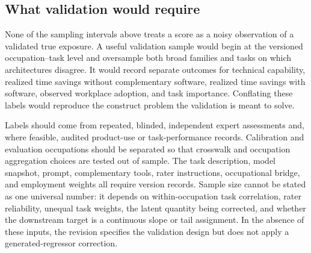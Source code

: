 

\subsection{What validation would require}

None of the sampling intervals above treats a score as a noisy observation of a validated true exposure.  A useful validation sample would begin at the versioned occupation--task level and oversample both broad families and tasks on which architectures disagree.  It would record separate outcomes for technical capability, realized time savings without complementary software, realized time savings with software, observed workplace adoption, and task importance.  Conflating these labels would reproduce the construct problem the validation is meant to solve.

Labels should come from repeated, blinded, independent expert assessments and, where feasible, audited product-use or task-performance records.  Calibration and evaluation occupations should be separated so that crosswalk and occupation aggregation choices are tested out of sample.  The task description, model snapshot, prompt, complementary tools, rater instructions, occupational bridge, and employment weights all require version records.  Sample size cannot be stated as one universal number: it depends on within-occupation task correlation, rater reliability, unequal task weights, the latent quantity being corrected, and whether the downstream target is a continuous slope or tail assignment.  In the absence of these inputs, the revision specifies the validation design but does not apply a generated-regressor correction.
